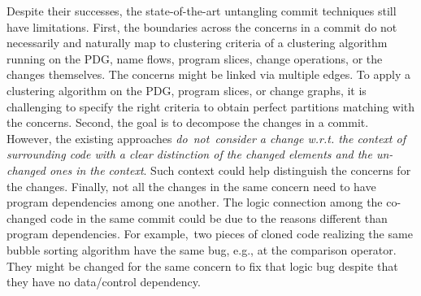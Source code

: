 

Despite their successes, the state-of-the-art untangling commit
techniques still have limitations. First, the boundaries across the
concerns in a commit do not necessarily and naturally map to
clustering criteria of a clustering algorithm running on the PDG, name
flows, program slices, change operations, or the changes
themselves. The concerns might be linked via multiple edges.
To apply a clustering algorithm on the PDG, program slices, or change
graphs, it is challenging to specify the right criteria to obtain
perfect partitions matching with the concerns.
%
Second, the goal is to decompose the changes in a commit. However, the
existing approaches {\em do~not~consider a change w.r.t. the context
  of surrounding code with a clear distinction of the changed elements
  and the un-changed ones in the context}. Such context could help
distinguish the concerns for the changes. Finally, not all the changes
in the same concern need to have program dependencies among one
another. The logic connection among the co-changed code in the same
commit could be due to the reasons different than program
dependencies. For example,~two pieces of cloned code realizing the
same bubble sorting algorithm have the same bug, e.g., at the
comparison operator. They might be changed for the same concern to fix
that logic bug despite that they have no data/control dependency.



